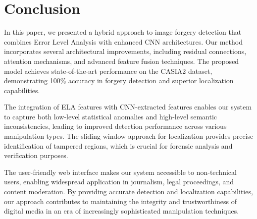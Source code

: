 \documentclass[conference]{IEEEtran}
\begin{document}
\section{Conclusion}
In this paper, we presented a hybrid approach to image forgery detection that combines Error Level Analysis with enhanced CNN architectures. Our method incorporates several architectural improvements, including residual connections, attention mechanisms, and advanced feature fusion techniques. The proposed model achieves state-of-the-art performance on the CASIA2 dataset, demonstrating 100\% accuracy in forgery detection and superior localization capabilities.

The integration of ELA features with CNN-extracted features enables our system to capture both low-level statistical anomalies and high-level semantic inconsistencies, leading to improved detection performance across various manipulation types. The sliding window approach for localization provides precise identification of tampered regions, which is crucial for forensic analysis and verification purposes.

The user-friendly web interface makes our system accessible to non-technical users, enabling widespread application in journalism, legal proceedings, and content moderation. By providing accurate detection and localization capabilities, our approach contributes to maintaining the integrity and trustworthiness of digital media in an era of increasingly sophisticated manipulation techniques.
\end{document}
